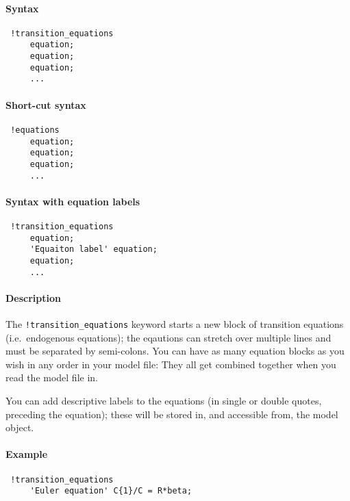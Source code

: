 


	\paragraph{Syntax}
 
 \begin{verbatim}
 !transition_equations
     equation;
     equation;
     equation;
     ...
 \end{verbatim}
 
 \paragraph{Short-cut syntax}
 
 \begin{verbatim}
 !equations
     equation;
     equation;
     equation;
     ...
 \end{verbatim}
 
 \paragraph{Syntax with equation labels}
 
 \begin{verbatim}
 !transition_equations
     equation;
     'Equaiton label' equation;
     equation;
     ...
 \end{verbatim}
 
 \paragraph{Description}
 
 The \texttt{!transition\_equations} keyword starts a new block of
 transition equations (i.e.~endogenous equations); the eqautions can
 stretch over multiple lines and must be separated by semi-colons. You
 can have as many equation blocks as you wish in any order in your model
 file: They all get combined together when you read the model file in.
 
 You can add descriptive labels to the equations (in single or double
 quotes, preceding the equation); these will be stored in, and accessible
 from, the model object.
 
 \paragraph{Example}
 
 \begin{verbatim}
 !transition_equations
     'Euler equation' C{1}/C = R*beta;
 \end{verbatim}


